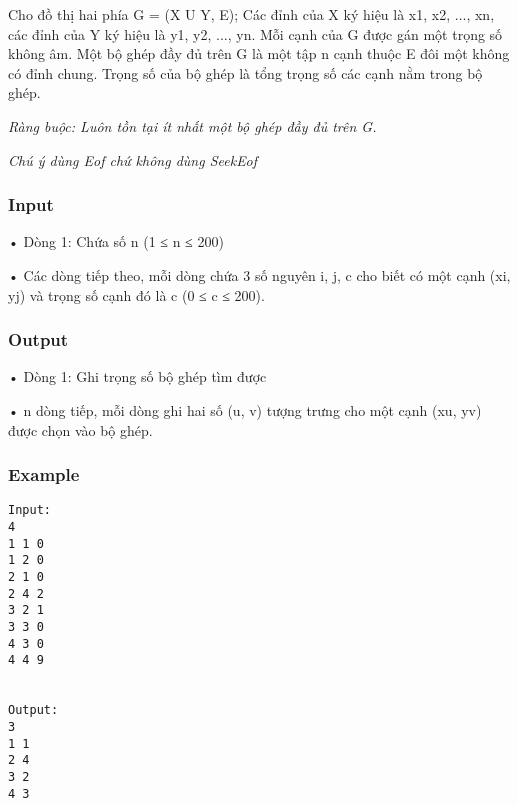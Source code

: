 



   Cho đồ thị hai phía G = (X U Y, E); Các đỉnh của X ký hiệu là x1, x2, ..., xn, các đỉnh của Y ký hiệu là y1, y2, ..., yn. Mỗi cạnh của G được gán một trọng số không âm. Một bộ ghép đầy đủ trên G là một tập n cạnh thuộc E đôi một không có đỉnh chung. Trọng số của  bộ ghép là tổng trọng số các cạnh nằm trong bộ ghép.   





\textit{    Ràng buộc: Luôn tồn tại ít nhất một bộ ghép đầy đủ trên G.   }


\textit{    Chú ý dùng         Eof        chứ không dùng         SeekEof       }

\subsubsection{   Input  }

   • Dòng 1: Chứa số n (1 ≤ n ≤ 200)   


   • Các dòng tiếp theo, mỗi dòng chứa 3 số nguyên i, j, c cho biết có một cạnh (xi, yj) và trọng số cạnh đó là c (0 ≤ c ≤ 200).  

\subsubsection{   Output  }

   • Dòng 1: Ghi trọng số bộ ghép tìm được   


   • n dòng tiếp, mỗi dòng ghi hai số (u, v) tượng trưng cho một cạnh (xu, yv) được chọn vào bộ ghép.  

\subsubsection{   Example  }
\begin{verbatim}
Input:
4
1 1 0
1 2 0
2 1 0
2 4 2
3 2 1
3 3 0
4 3 0
4 4 9


Output:
3
1 1
2 4
3 2
4 3

\end{verbatim}
